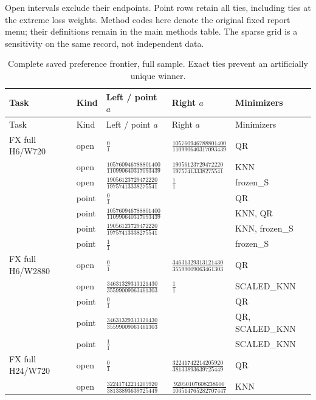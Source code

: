 \documentclass[11pt,a4paper]{article}
\begin{document}
Open intervals exclude their endpoints. Point rows retain all
ties, including ties at the extreme loss weights. Method codes here denote
the original fixed report menu; their definitions remain in the main methods
table. The sparse grid is a sensitivity on the same record, not independent
data.\begingroup
\scriptsize
\setlength{\tabcolsep}{3pt}
\renewcommand{\arraystretch}{1.12}
\begin{longtable}{p{28mm}p{10mm}p{39mm}p{39mm}p{28mm}}
\caption{Complete saved preference frontier, full sample. Exact ties prevent an artificially unique winner.}\\
\toprule
Task & Kind & Left / point \(a\) & Right \(a\) & Minimizers \\
\midrule
\endfirsthead
\toprule
Task & Kind & Left / point \(a\) & Right \(a\) & Minimizers \\
\midrule
\endhead
\bottomrule
\endfoot
FX full H6/W720 & open & \(\frac{0}{1}\) & \(\frac{105760946788801400}{110990640317093439}\) & QR \\
 & open & \(\frac{105760946788801400}{110990640317093439}\) & \(\frac{19056123729472220}{19757413338275541}\) & KNN \\
 & open & \(\frac{19056123729472220}{19757413338275541}\) & \(\frac{1}{1}\) & frozen\_S \\
 & point & \(\frac{0}{1}\) &  & QR \\
 & point & \(\frac{105760946788801400}{110990640317093439}\) &  & KNN, QR \\
 & point & \(\frac{19056123729472220}{19757413338275541}\) &  & KNN, frozen\_S \\
 & point & \(\frac{1}{1}\) &  & frozen\_S \\
FX full H6/W2880 & open & \(\frac{0}{1}\) & \(\frac{34631329313121430}{35599009063461303}\) & QR \\
 & open & \(\frac{34631329313121430}{35599009063461303}\) & \(\frac{1}{1}\) & SCALED\_KNN \\
 & point & \(\frac{0}{1}\) &  & QR \\
 & point & \(\frac{34631329313121430}{35599009063461303}\) &  & QR, SCALED\_KNN \\
 & point & \(\frac{1}{1}\) &  & SCALED\_KNN \\
FX full H24/W720 & open & \(\frac{0}{1}\) & \(\frac{32241742214205920}{38133893639725449}\) & QR \\
 & open & \(\frac{32241742214205920}{38133893639725449}\) & \(\frac{92050107608238600}{103514765282707447}\) & KNN \\

\end{longtable}
\end{document}
